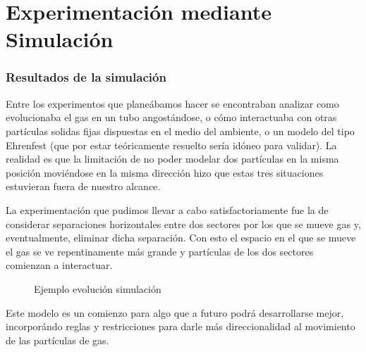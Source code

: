 \documentclass[10pt,a4paper]{article}
\begin{document}
 

\part*{Experimentaci\'on mediante Simulaci\'on}
\section*{Resultados de la simulaci\'on}

Entre los experimentos que plane\'abamos hacer se encontraban analizar como evolucionaba el gas en un tubo angost\'andose, o c\'omo interactuaba con otras part\'iculas solidas fijas dispuestas en el medio del ambiente, o un modelo del tipo Ehrenfest (que por estar te\'oricamente resuelto ser\'ia id\'oneo para validar). La realidad es que la limitaci\'on de no poder modelar dos part\'iculas en la misma posici\'on movi\'endose en la misma direcci\'on hizo que estas tres situaciones estuvieran fuera de nuestro alcance.

La experimentaci\'on que pudimos llevar a cabo satisfactoriamente fue la de considerar separaciones horizontales entre dos sectores por los que se mueve gas y, eventualmente, eliminar dicha separaci\'on. Con esto el espacio en el que se mueve el gas se ve repentinamente m\'as grande y part\'iculas de los dos sectores comienzan a interactuar.

\begin{figure}[htbp]
\centering
{}
\caption{Ejemplo evolución simulación}
\end{figure}



Este modelo es un comienzo para algo que a futuro podr\'a desarrollarse mejor, incorpor\'ando reglas y restricciones para darle m\'as direccionalidad al movimiento de las part\'iculas de gas.
\end{document}
